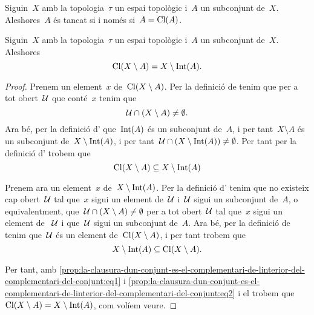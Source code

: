 \documentclass[../topologia.tex]{subfiles}
\begin{document}
    \begin{corollary}
        \label{cor:un-conjunt-es-tancat-si-i-nomes-si-es-igual-a-la-seva-clausura}
        Siguin~\(X\) amb la topologia~\(\tau\) un espai topològic i~\(A\) un subconjunt de~\(X\).
        Aleshores~\(A\) és tancat si i només si~\(A=\operatorname{Cl}(A)\).
    \end{corollary}
    \begin{proposition}
        \label{prop:la-clausura-dun-conjunt-es-el-complementari-de-linterior-del-complementari-del-conjunt}
        Siguin~\(X\) amb la topologia~\(\tau\) un espai topològic i~\(A\) un subconjunt de~\(X\).
        Aleshores
        \[
            \operatorname{Cl}(X\setminus A)=X\setminus\operatorname{Int}(A).
        \]
    \end{proposition}
    \begin{proof} %
        Prenem un element~\(x\) de~\(\operatorname{Cl}(X\setminus A)\).
        Per la definició de  tenim que per a tot obert~\(\mathcal{U}\) que conté~\(x\) tenim que
        \[
            \mathcal{U}\cap(X\setminus A)\neq\emptyset.
        \]
        Ara bé, per la definició d' que~\(\operatorname{Int}(A)\) és un subconjunt de~\(A\), i per tant~\(X\setminus A\) és un subconjunt de~\(X\setminus\operatorname{Int}(A)\), i per tant~\(\mathcal{U}\cap(X\setminus\operatorname{Int}(A))\neq\emptyset\).
        Per tant per la definició d' trobem que
        \begin{equation}
            \label{prop:la-clausura-dun-conjunt-es-el-complementari-de-linterior-del-complementari-del-conjunt:eq1}
            \operatorname{Cl}(X\setminus A)\subseteq X\setminus\operatorname{Int}(A)
        \end{equation}

        Prenem ara un element~\(x\) de~\(X\setminus\operatorname{Int}(A)\).
        Per la definició d' tenim que no existeix cap obert~\(\mathcal{U}\) tal que~\(x\) sigui un element de~\(\mathcal{U}\) i~\(\mathcal{U}\) sigui un subconjunt de~\(A\), o equivalentment, que~\(\mathcal{U}\cap(X\setminus A)\neq\emptyset\) per a tot obert~\(\mathcal{U}\) tal que~\(x\) sigui un element de ~\(\mathcal{U}\) i que~\(\mathcal{U}\) sigui un subconjunt de~\(A\).
        Ara bé, per la definició de  tenim que~\(\mathcal{U}\) és un element de~\(\operatorname{Cl}(X\setminus A)\), i per tant trobem que
        \begin{equation}
            \label{prop:la-clausura-dun-conjunt-es-el-complementari-de-linterior-del-complementari-del-conjunt:eq2}
            X\setminus\operatorname{Int}(A)\subseteq\operatorname{Cl}(X\setminus A).
        \end{equation}

        Per tant, amb \eqref{prop:la-clausura-dun-conjunt-es-el-complementari-de-linterior-del-complementari-del-conjunt:eq1} i \eqref{prop:la-clausura-dun-conjunt-es-el-complementari-de-linterior-del-complementari-del-conjunt:eq2} i el  trobem que~\(\operatorname{Cl}(X\setminus A)=X\setminus\operatorname{Int}(A)\), com volíem veure.
    \end{proof}
\end{document}
